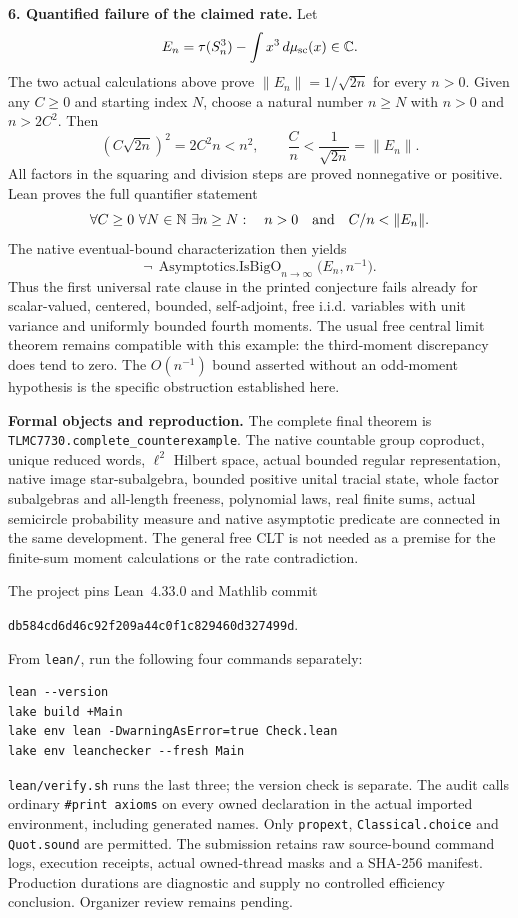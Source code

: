 \documentclass[10pt]{article}
\newcommand{\C}{\mathbb C}
\newcommand{\N}{\mathbb N}
\begin{document}
\newpage
\textbf{6. Quantified failure of the claimed rate.}
Let
\[
 E_n=\tau(S_n^3)-\int x^3\,d\mu_{\rm sc}(x)\in\C.
\]
The two actual calculations above prove $\|E_n\|=1/\sqrt{2n}$
for every $n>0$. Given any $C\ge0$ and starting index $N$, choose a
natural number $n\ge N$ with $n>0$ and $n>2C^2$. Then
\[
 (C\sqrt{2n})^2=2C^2n<n^2,
 \qquad
 \frac Cn<\frac1{\sqrt{2n}}=\|E_n\|.
\]
All factors in the squaring and division steps are proved nonnegative
or positive. Lean proves the full quantifier statement
\[
 \forall C\ge0\ \forall N\in\N\ \exists n\ge N:
 \quad n>0\quad\hbox{and}\quad C/n<\|E_n\|.
\]
The native eventual-bound characterization then yields
\[
 \neg\,\operatorname{Asymptotics.IsBigO}_{n\to\infty}
       \bigl(E_n,n^{-1}\bigr).
\]
Thus the first universal rate clause in the printed conjecture fails
already for scalar-valued, centered, bounded, self-adjoint, free i.i.d.
variables with unit variance and uniformly bounded fourth moments.
The usual free central limit theorem remains compatible with this
example: the third-moment discrepancy does tend to zero. The
$O(n^{-1})$ bound asserted without an odd-moment hypothesis is the
specific obstruction established here.

\textbf{Formal objects and reproduction.}
The complete final theorem is \texttt{TLMC7730.complete\_counterexample}.
The native countable group coproduct, unique reduced words,
$\ell^2$ Hilbert space, actual bounded regular representation, native
image star-subalgebra, bounded positive unital tracial state, whole
factor subalgebras and all-length freeness, polynomial laws, real finite
sums, actual semicircle probability measure and native asymptotic
predicate are connected in the same development. The general free CLT
is not needed as a premise for the finite-sum moment calculations or
the rate contradiction.

The project pins Lean~4.33.0 and Mathlib commit
\begin{center}
{\footnotesize\texttt{db584cd6d46c92f209a44c0f1c829460d327499d}}.
\end{center}
From \texttt{lean/}, run the following four commands separately:
\begin{verbatim}
lean --version
lake build +Main
lake env lean -DwarningAsError=true Check.lean
lake env leanchecker --fresh Main
\end{verbatim}
\texttt{lean/verify.sh} runs the last three; the version check is separate.
The audit calls ordinary \texttt{\#print axioms} on every owned declaration
in the actual imported environment, including generated names. Only
\texttt{propext}, \texttt{Classical.choice} and \texttt{Quot.sound} are
permitted. The submission retains raw source-bound command logs,
execution receipts, actual owned-thread masks and a SHA-256 manifest.
Production durations are diagnostic and supply no controlled
efficiency conclusion. Organizer review remains pending.
\end{document}
